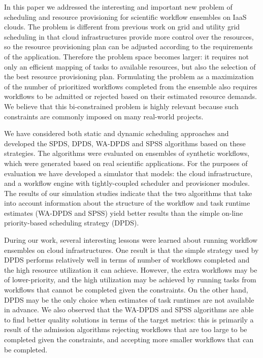 \documentclass{sig-alternate}
\begin{document}
In this paper we addressed the interesting and important new problem of 
scheduling and resource provisioning for scientific workflow ensembles 
on IaaS clouds. The problem is different from previous work on grid and 
utility grid scheduling in that cloud infrastructures provide more control 
over the resources, so the resource provisioning plan can be adjusted 
according to the requirements of the application. Therefore the problem 
space becomes larger: it requires not only an efficient mapping of tasks
to available resources, but also the selection of the best resource 
provisioning plan. Formulating the problem as a maximization of the
number of prioritized workflows completed from the ensemble also 
requires workflows to be admitted or rejected based on their estimated 
resource demands. We believe that this bi-constrained problem is highly 
relevant because such constraints are commonly imposed on many real-world 
projects.

We have considered both static and dynamic scheduling approaches and 
developed the SPDS, DPDS, WA-DPDS and SPSS algorithms based on these 
strategies. The algorithms were evaluated on ensembles of synthetic 
workflows, which were generated based on real scientific applications. For 
the purposes of evaluation we have developed a simulator that models: the 
cloud infrastructure, and a workflow engine with tightly-coupled scheduler 
and provisioner modules. The results of our simulation studies indicate 
that the two algorithms that take into account information about the 
structure of the workflow and task runtime estimates (WA-DPDS and SPSS) 
yield better results than the simple on-line priority-based scheduling 
strategy (DPDS).

During our work, several interesting lessons were learned about running 
workflow ensembles on cloud infrastructures. One result is that the simple 
strategy used by DPDS performs relatively well in terms of number of 
workflows completed and the high resource utilization it can achieve. However,
the extra workflows may be of lower-priority, and the high utilization
may be achieved by running tasks from workflows that cannot be completed
given the constraints. On the other hand, DPDS may be the only choice when 
estimates of task runtimes are not available in advance. We also observed
that the WA-DPDS and SPSS algorithms are able to find better quality 
solutions in terms of the target metrics: this is primarily a result of the 
admission algorithms rejecting workflows that are too large to be completed 
given the constraints, and accepting more smaller workflows that can be 
completed.
\end{document}
